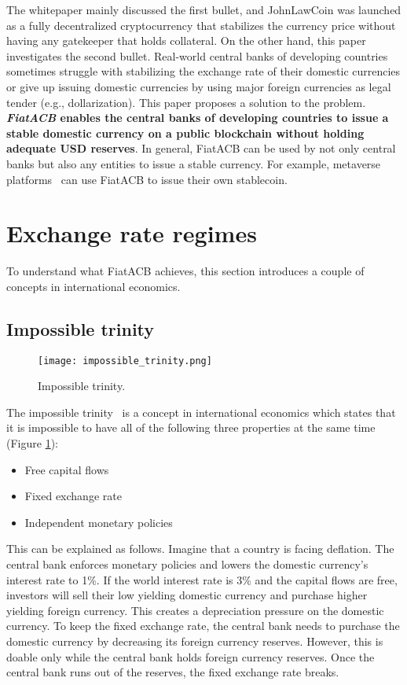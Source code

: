\documentclass[dvipdfmx,a4paper]{article}
\begin{document}
The whitepaper mainly discussed the first bullet, and JohnLawCoin was launched as a fully decentralized cryptocurrency that stabilizes the currency price without having any gatekeeper that holds collateral. On the other hand, this paper investigates the second bullet. Real-world central banks of developing countries sometimes struggle with stabilizing the exchange rate of their domestic currencies or give up issuing domestic currencies by using major foreign currencies as legal tender (e.g., dollarization). This paper proposes a solution to the problem. \textbf{\textit{FiatACB} enables the central banks of developing countries to issue a stable domestic currency on a public blockchain without holding adequate USD reserves}. In general, FiatACB can be used by not only central banks but also any entities to issue a stable currency. For example, metaverse platforms~\cite{duan2021metaverse,wang2021non} can use FiatACB to issue their own stablecoin.

\section{Exchange rate regimes}

To understand what FiatACB achieves, this section introduces a couple of concepts in international economics.

\subsection{Impossible trinity}

\begin{figure}[tb]
\centering
\texttt{[image: impossible\_trinity.png]}
\caption{Impossible trinity.}
\label{impossible_trinity}
\end{figure}

The impossible trinity~\cite{aizenman2013impossible} is a concept in international economics which states that it is impossible to have all of the following three properties at the same time (Figure \ref{impossible_trinity}):

\begin{itemize}
\item Free capital flows
\item Fixed exchange rate
\item Independent monetary policies
\end{itemize}

This can be explained as follows. Imagine that a country is facing deflation. The central bank enforces monetary policies and lowers the domestic currency's interest rate to 1\%. If the world interest rate is 3\% and the capital flows are free, investors will sell their low yielding domestic currency and purchase higher yielding foreign currency. This creates a depreciation pressure on the domestic currency. To keep the fixed exchange rate, the central bank needs to purchase the domestic currency by decreasing its foreign currency reserves. However, this is doable only while the central bank holds foreign currency reserves. Once the central bank runs out of the reserves, the fixed exchange rate breaks.
\end{document}
